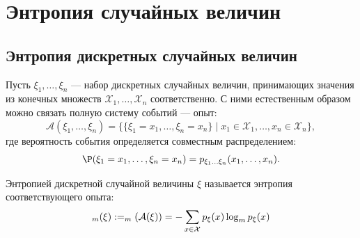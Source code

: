 %
%
%
%



\section{Энтропия случайных величин}
\localtableofcontents

\subsection{Энтропия дискретных случайных величин}


Пусть $\xi_1, \ldots, \xi_n$ --- набор дискретных случайных величин, принимающих значения из конечных множеств $\mathcal{X}_1, \ldots, \mathcal{X}_n$ соответственно. С ними естественным образом можно связать полную систему событий — опыт:
\[
	\mathcal{A}(\xi_1, \ldots, \xi_n) = \bigl\{ \{\xi_1 = x_1, \ldots, \xi_n = x_n\} \;\big|\; x_1 \in \mathcal{X}_1, \ldots, x_n \in \mathcal{X}_n \bigr\},
\]
где вероятность события определяется совместным распределением:
\[
	\P(\xi_1 = x_1, \ldots, \xi_n = x_n) = p_{\xi_1\ldots\xi_n}(x_1,\ldots,x_n).
\]

\begin{definition}
	Энтропией дискретной случайной величины $\xi$ называется энтропия соответствующего опыта:
	\[
		\relax_m(\xi) := \relax_m(\mathcal{A}(\xi)) = -\sum_{x \in \mathcal{X}} p_\xi(x) \log_m p_{\xi}(x)
	\]
\end{definition}

